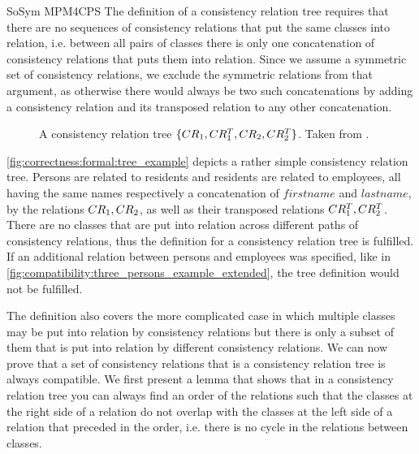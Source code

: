 \begin{copiedFrom}{SoSym MPM4CPS}
The definition of a consistency relation tree requires that there are no sequences of consistency relations that put the same classes into relation, i.e. between all pairs of classes there is only one concatenation of consistency relations that puts them into relation.
Since we assume a symmetric set of consistency relations, we exclude the symmetric relations from that argument, as otherwise there would always be two such concatenations by adding a consistency relation and its transposed relation to any other concatenation.

\begin{figure}
    \centering
    
    \caption[A consistency relation tree]{A consistency relation tree $\{ CR_{1}, CR^T_{1}, CR_{2}, CR^T_{2} \}$. Taken from .}
    \label{fig:correctness:formal:tree_example}
\end{figure}

\begin{example}
\autoref{fig:correctness:formal:tree_example} depicts a rather simple consistency relation tree. 
Persons are related to residents and residents are related to employees, all having the same names respectively a concatenation of $firstname$ and $lastname$, by the relations $CR_{1}, CR_{2}$, as well as their transposed relations $CR^T_{1}, CR^T_{2}$.
There are no classes that are put into relation across different paths of consistency relations, thus the definition for a consistency relation tree is fulfilled. 
If an additional relation between persons and employees was specified, like in \autoref{fig:compatibility:three_persons_example_extended}, the tree definition would not be fulfilled.
\end{example}

The definition also covers the more complicated case in which multiple classes may be put into relation by consistency relations but there is only a subset of them that is put into relation by different consistency relations.
%
%
We can now prove that a set of consistency relations that is a consistency relation tree is always compatible.
We first present a lemma that shows that in a consistency relation tree you can always find an order of the relations such that the classes at the right side of a relation do not overlap with the classes at the left side of a relation that preceded in the order, i.e. there is no cycle in the relations between classes.


\end{copiedFrom}
